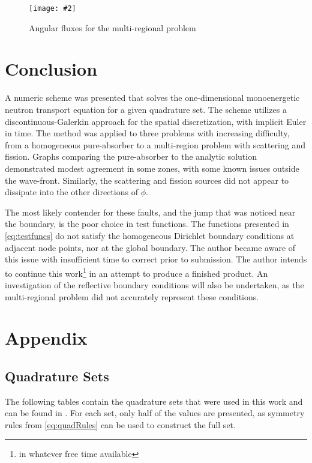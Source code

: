 \documentclass{article}
\newcommand{\myfig}[2]{\texttt{[image: \#2]}}
\begin{document}
\begin{figure}
    \centering
    \myfig{3.5in}{../figures/example-multimedia.png}
    \caption{Angular fluxes for the multi-regional problem}
    \label{fig:fluxesMultiReg}
\end{figure}

\section{Conclusion} \label{sec:conclusion}

A numeric scheme was presented that solves the one-dimensional monoenergetic neutron transport
equation for a given quadrature set. 
The scheme utilizes a discontinuous-Galerkin approach for the spatial discretization, with
implicit Euler in time.
The method was applied to three problems with increasing difficulty, from a homogeneous pure-absorber 
to a multi-region problem with scattering and fission.
Graphs comparing the pure-absorber to the analytic solution demonstrated modest agreement in some zones,
with some known issues outside the wave-front.
Similarly, the scattering and fission sources did not appear to dissipate into the other directions of
$\phi$.

The most likely contender for these faults, and the jump that was noticed near the boundary, is the 
poor choice in test functions. 
The functions presented in \cref{eq:testfuncs} do not satisfy the homogeneous Dirichlet boundary
conditions at adjacent node points, nor at the global boundary.
The author became aware of this issue with insufficient time to correct prior to submission.
The author intends to continue this work\footnote{in whatever free time available} in an attempt
to produce a finished product.
An investigation of the reflective boundary conditions will also be undertaken, as the multi-regional
problem did not accurately represent these conditions.





\section{Appendix}

\subsection{Quadrature Sets} \label{sec:qsets}
The following tables contain the quadrature sets that were used in this work and can be found
in \cite{lewis1984computational}.
For each set, only half of the values are presented, as symmetry rules from \cref{eq:quadRules}
can be used to construct the full set.



\end{document}
